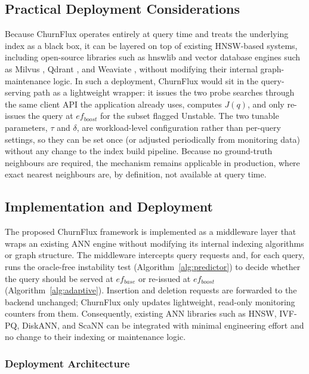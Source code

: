 \documentclass{ieeeaccess}
\begin{document}
\subsection{Practical Deployment Considerations}
Because ChurnFlux operates entirely at query time and treats the underlying index as a black box, it can be layered on top of existing HNSW-based systems, including open-source libraries such as hnswlib \cite{Malkov2020} and vector database engines such as Milvus \cite{Milvus}, Qdrant \cite{Qdrant}, and Weaviate \cite{Weaviate}, without modifying their internal graph-maintenance logic. In such a deployment, ChurnFlux would sit in the query-serving path as a lightweight wrapper: it issues the two probe searches through the same client API the application already uses, computes $J(q)$, and only re-issues the query at $ef_{boost}$ for the subset flagged Unstable. The two tunable parameters, $\tau$ and $\delta$, are workload-level configuration rather than per-query settings, so they can be set once (or adjusted periodically from monitoring data) without any change to the index build pipeline. Because no ground-truth neighbours are required, the mechanism remains applicable in production, where exact nearest neighbours are, by definition, not available at query time.

\subsection{Implementation and Deployment}
\label{sec:implementation}
The proposed ChurnFlux framework is implemented as a middleware layer that wraps an existing ANN engine without modifying its internal indexing algorithms or graph structure. The middleware intercepts query requests and, for each query, runs the oracle-free instability test (Algorithm~\ref{alg:predictor}) to decide whether the query should be served at $ef_{base}$ or re-issued at $ef_{boost}$ (Algorithm~\ref{alg:adaptive}). Insertion and deletion requests are forwarded to the backend unchanged; ChurnFlux only updates lightweight, read-only monitoring counters from them. Consequently, existing ANN libraries such as HNSW, IVF-PQ, DiskANN, and ScaNN can be integrated with minimal engineering effort and no change to their indexing or maintenance logic.

\subsubsection{Deployment Architecture}
\end{document}
